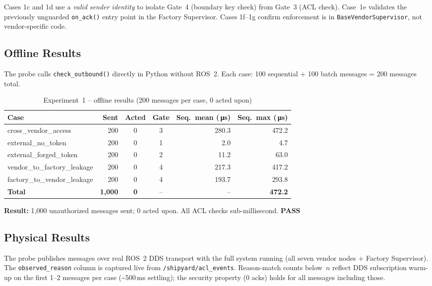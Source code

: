 \documentclass[11pt,a4paper]{article}
\newcommand{\pass}{\textcolor{passgreen}{\textbf{PASS}}}
\newcommand{\us}{\,\si{\micro s}}
\begin{document}
Cases 1c and 1d use a \emph{valid sender identity} to isolate Gate~4
(boundary key check) from Gate~3 (ACL check).
Case~1e validates the previously unguarded \texttt{on\_ack()} entry point in
the Factory Supervisor.
Cases 1f--1g confirm enforcement is in \texttt{BaseVendorSupervisor}, not
vendor-specific code.

\subsection{Offline Results}

The probe calls \texttt{check\_outbound()} directly in Python without ROS~2.
Each case: 100 sequential + 100 batch messages = 200 messages total.

\begin{table}[h]
\centering
\caption{Experiment~1 -- offline results (200 messages per case, 0 acted upon)}
\label{tab:exp1-offline}
\begin{tabular}{@{}lrccrr@{}}
\toprule
\textbf{Case} & \textbf{Sent} & \textbf{Acted} & \textbf{Gate} &
\textbf{Seq.\ mean (\us)} & \textbf{Seq.\ max (\us)} \\
\midrule
cross\_vendor\_access        & 200 & 0 & 3 & 280.3 & 472.2 \\
external\_no\_token          & 200 & 0 & 1 &   2.0 &   4.7 \\
external\_forged\_token      & 200 & 0 & 2 &  11.2 &  63.0 \\
vendor\_to\_factory\_leakage & 200 & 0 & 4 & 217.3 & 417.2 \\
factory\_to\_vendor\_leakage & 200 & 0 & 4 & 193.7 & 293.8 \\
\midrule
\textbf{Total}               & \textbf{1{,}000} & \textbf{0} & -- & -- & \textbf{472.2} \\
\bottomrule
\end{tabular}
\end{table}

\noindent\textbf{Result:} 1{,}000 unauthorized messages sent; 0 acted upon.
All ACL checks sub-millisecond. \pass{}

\subsection{Physical Results}

The probe publishes messages over real ROS~2 DDS transport with the full
system running (all seven vendor nodes + Factory Supervisor).
The \texttt{observed\_reason} column is captured live from
\texttt{/shipyard/acl\_events}.
Reason-match counts below~$n$ reflect DDS subscription warm-up on the first
1--2 messages per case (\textasciitilde500\,ms settling); the security
property (0 acks) holds for all messages including those.
\end{document}
